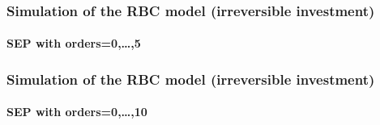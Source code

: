 \documentclass{beamer}
\begin{document}
\begin{frame}
    \frametitle{Simulation of the RBC model (irreversible investment)}
    \framesubtitle{SEP with orders=0,\dots,5}
  \begin{center}
    \scalebox{.5}{
  }
  \end{center}

\end{frame}


\begin{frame}
    \frametitle{Simulation of the RBC model (irreversible investment)}
    \framesubtitle{SEP with orders=0,\dots,10}
  \begin{center}
    \scalebox{.5}{
  }
  \end{center}

\end{frame}
\end{document}

